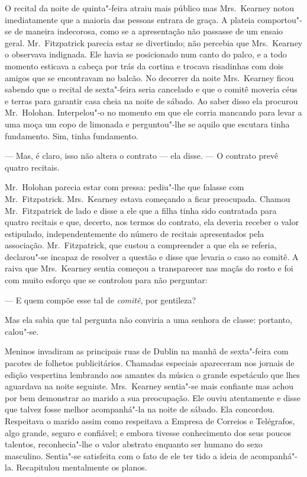 O recital da noite de quinta"-feira atraiu mais público mas Mrs.~Kearney notou
imediatamente que a maioria das pessoas entrara de graça.  A plateia
comportou"-se de maneira indecorosa, como se a apresentação não passasse de um
ensaio geral.  Mr.~Fitzpatrick parecia estar se divertindo; não percebia que
Mrs.~Kearney o observava indignada.  Ele havia se posicionado num canto do
palco, e a todo momento esticava a cabeça por trás da cortina e trocava
risadinhas com dois amigos que se encontravam no balcão.  No decorrer da noite
Mrs.~Kearney ficou sabendo que o recital de sexta"-feira seria cancelado e que o
comitê moveria céus e terras para garantir casa cheia na noite de sábado.  Ao
saber disso ela procurou Mr.~Holohan.  Interpelou"-o no momento em que ele
corria mancando para levar a uma moça um copo de limonada e perguntou"-lhe se
aquilo que escutara tinha fundamento.  Sim, tinha fundamento.

--- Mas, é claro, isso não altera o contrato --- ela disse.  --- O contrato
prevê quatro recitais.

Mr.~Holohan parecia estar com pressa: pediu"-lhe que falasse com Mr.~Fitzpatrick.  
Mrs.~Kearney estava começando a ficar preocupada.  Chamou Mr.~Fitzpatrick de lado 
e disse a ele que a filha tinha sido contratada para quatro
recitais e que, decerto, nos termos do contrato, ela deveria receber o valor
estipulado, independentemente do número de recitais apresentados pela
associação.  Mr.~Fitzpatrick, que custou a compreender a que ela se referia,
declarou"-se incapaz de resolver a questão e disse que levaria o caso ao comitê.
A raiva que Mrs.~Kearney sentia começou a transparecer nas maçãs do rosto e foi
com muito esforço que se controlou para não perguntar:

--- E quem compõe esse tal de \textit{comitê}, por gentileza?

Mas ela sabia que tal pergunta não conviria a uma senhora de classe: portanto,
calou"-se.

Meninos invadiram as principais ruas de Dublin na manhã de sexta"-feira com
pacotes de folhetos publicitários.  Chamadas especiais apareceram nos jornais
de edição vespertina lembrando aos amantes da música o grande espetáculo que
lhes aguardava na noite seguinte.  Mrs.~Kearney sentia"-se mais confiante mas
achou por bem demonstrar ao marido a sua preocupação.  Ele ouviu atentamente e
disse que talvez fosse melhor acompanhá"-la na noite de sábado.  Ela concordou.
Respeitava o marido assim como respeitava a Empresa de Correios e Telégrafos,
algo grande, seguro e confiável; e embora tivesse conhecimento dos seus poucos
talentos, reconhecia"-lhe o valor abstrato enquanto ser humano do sexo
masculino.  Sentia"-se satisfeita com o fato de ele ter tido a ideia de
acompanhá"-la.  Recapitulou mentalmente os planos.

